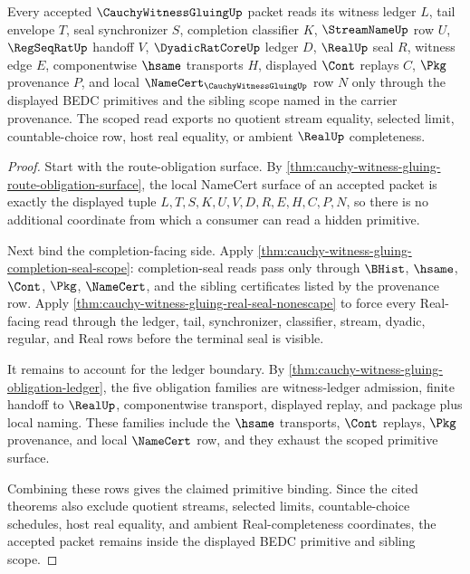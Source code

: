 \begin{theorem}
\label{thm:cauchy-witness-gluing-scoped-primitive-binding}
Every accepted $\CauchyWitnessGluingUp$ packet reads its witness ledger $L$, tail envelope $T$, seal synchronizer $S$, completion classifier $K$, $\StreamNameUp$ row $U$, $\RegSeqRatUp$ handoff $V$, $\DyadicRatCoreUp$ ledger $D$, $\RealUp$ seal $R$, witness edge $E$, componentwise $\hsame$ transports $H$, displayed $\Cont$ replays $C$, $\Pkg$ provenance $P$, and local $\NameCert_{\CauchyWitnessGluingUp}$ row $N$ only through the displayed BEDC primitives and the sibling scope named in the carrier provenance. The scoped read exports no quotient stream equality, selected limit, countable-choice row, host real equality, or ambient $\RealUp$ completeness.
\end{theorem}
\begin{proof}
Start with the route-obligation surface. By \autoref{thm:cauchy-witness-gluing-route-obligation-surface}, the local NameCert surface of an accepted packet is exactly the displayed tuple $L,T,S,K,U,V,D,R,E,H,C,P,N$, so there is no additional coordinate from which a consumer can read a hidden primitive.

Next bind the completion-facing side. Apply \autoref{thm:cauchy-witness-gluing-completion-seal-scope}: completion-seal reads pass only through $\BHist$, $\hsame$, $\Cont$, $\Pkg$, $\NameCert$, and the sibling certificates listed by the provenance row. Apply \autoref{thm:cauchy-witness-gluing-real-seal-nonescape} to force every Real-facing read through the ledger, tail, synchronizer, classifier, stream, dyadic, regular, and Real rows before the terminal seal is visible.

It remains to account for the ledger boundary. By \autoref{thm:cauchy-witness-gluing-obligation-ledger}, the five obligation families are witness-ledger admission, finite handoff to $\RealUp$, componentwise transport, displayed replay, and package plus local naming. These families include the $\hsame$ transports, $\Cont$ replays, $\Pkg$ provenance, and local $\NameCert$ row, and they exhaust the scoped primitive surface.

Combining these rows gives the claimed primitive binding. Since the cited theorems also exclude quotient streams, selected limits, countable-choice schedules, host real equality, and ambient Real-completeness coordinates, the accepted packet remains inside the displayed BEDC primitive and sibling scope.
\end{proof}

